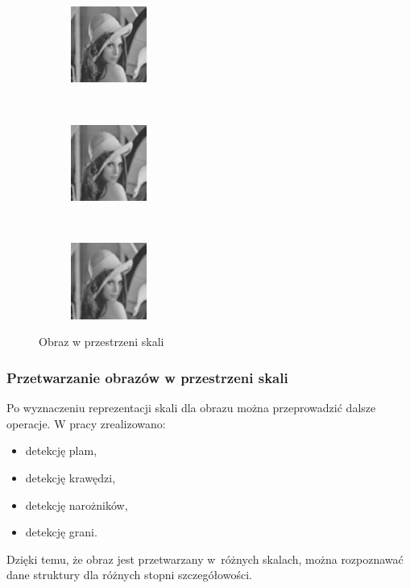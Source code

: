 \begin{frame}
\begin{figure}[h]
\begin{center}
			\begin{subfigure}[b]{2.5cm}
				\centering
				\includegraphics[width=2.5cm]{Lena_scales4.jpg}
			\end{subfigure}%
			~
			\begin{subfigure}[b]{2.5cm}
				\centering
				\includegraphics[width=2.5cm]{Lena_scales5.jpg}
			\end{subfigure}%
			~
			\begin{subfigure}[b]{2.5cm}
				\centering
				\includegraphics[width=2.5cm]{Lena_scales6.jpg}
			\end{subfigure}%
			\caption{Obraz w przestrzeni skali}
			\label{lena_scales}
		\end{center}
	\end{figure}
\end{frame}


\begin{frame}
	\frametitle{Przetwarzanie obrazów w przestrzeni skali}

	Po wyznaczeniu reprezentacji skali dla obrazu można przeprowadzić dalsze operacje. W pracy zrealizowano:
	\begin{itemize}
		\item detekcję plam,
		\item detekcję krawędzi,
		\item detekcję narożników,
		\item detekcję grani.
	\end{itemize}
	Dzięki temu, że obraz jest przetwarzany w~różnych skalach, można rozpoznawać dane struktury dla różnych stopni szczegółowości.
\end{frame}

